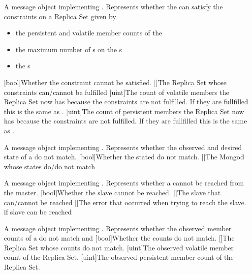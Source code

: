 {
  A message object implementing .
  Represents whether the  can satisfy the constraints on a Replica Set given by
  \begin{itemize}
    \item the persistent and volatile member counts of the 
    \item the maximum number of s on the s
    \item the s
  \end{itemize}
}{
  [bool]{Whether the constraint cannot be satisfied.}
  []{The Replica Set whose constraints can/cannot be fulfilled}
  [uint]{The count of volatile members the Replica Set now has because the constraints are not fulfilled. If they are fullfilled this is the same as .}
  [uint]{The count of persistent members the Replica Set now has because the constraints are not fulfilled. If they are fullfilled this is the same as .}
}

{
  A message object implementing .
Represents whether the observed and desired state of a  do not match.
}{
  [bool]{Whether the stated do not match.}
  []{The Mongod whose states do/do not match}
}

{
  A message object implementing .
Represents whether a  cannot be reached from the master.
}{
  [bool]{Whether the slave cannot be reached.}
  []{The slave that can/cannot be reached}
  []{The error that occurred when trying to reach the slave.  if slave can be reached}
}

{
A message object implementing .
  Represents whether the observed member counts of a  do not match  and 
}{
  [bool]{Whether the counts do not match.}
  []{The Replica Set whose counts do not match.}
  [uint]{The observed volatile member count of the Replica Set.}
  [uint]{The observed persistent member count of the Replica Set.}
}


